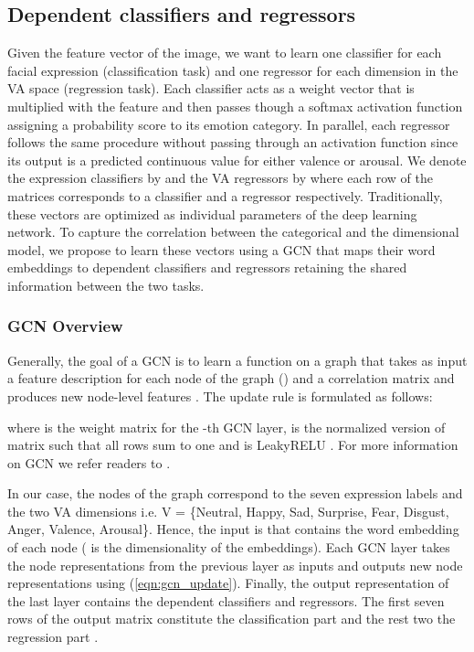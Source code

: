 \documentclass[a4paper, 10pt, conference]{ieeeconf}      \usepackage{FG2021}
\begin{document}
\subsection{Dependent classifiers and regressors}

Given the feature vector  of the image, we want to learn one classifier for each facial expression (classification task) and one regressor for each dimension in the VA space (regression task). Each classifier acts as a weight vector that is multiplied with the feature  and then passes though a softmax activation function assigning a probability score to its emotion category. In parallel, each regressor follows the same procedure without passing through an activation function since its output is a  predicted continuous value for either valence or arousal. We denote the expression classifiers by  and the VA regressors by  where each row of the matrices corresponds to a classifier and a regressor respectively. Traditionally, these vectors are optimized as individual parameters of the deep learning network. To capture the correlation between the categorical and the dimensional model, we propose to learn these vectors using a GCN that maps their word embeddings to dependent classifiers and regressors retaining the shared information between the two tasks.

\subsubsection{GCN Overview}

Generally, the goal of a GCN is to learn a function  on a graph  that takes as input a feature description for each node of the graph  () and a correlation matrix  and produces new node-level features . The update rule is formulated as follows:

where  is the weight matrix for the -th GCN layer,  is the normalized version of matrix  such that all rows sum to one and  is LeakyRELU \cite{maas2013rectifier}. For more information on GCN we refer readers to \cite{kipf2016semi}.

In our case, the nodes of the graph correspond to the seven expression labels and the two VA dimensions i.e. V = \{Neutral, Happy, Sad, Surprise, Fear, Disgust, Anger, Valence, Arousal\}. Hence, the input is  that contains the word embedding of each node ( is the dimensionality of the embeddings). Each GCN layer  takes the node representations from the previous layer  as inputs and outputs new node representations   using (\ref{eqn:gcn_update}). Finally, the output representation of the last layer  contains the dependent classifiers and regressors. The first seven rows of the output matrix  constitute the classification part  and the rest two the regression part .
\end{document}
